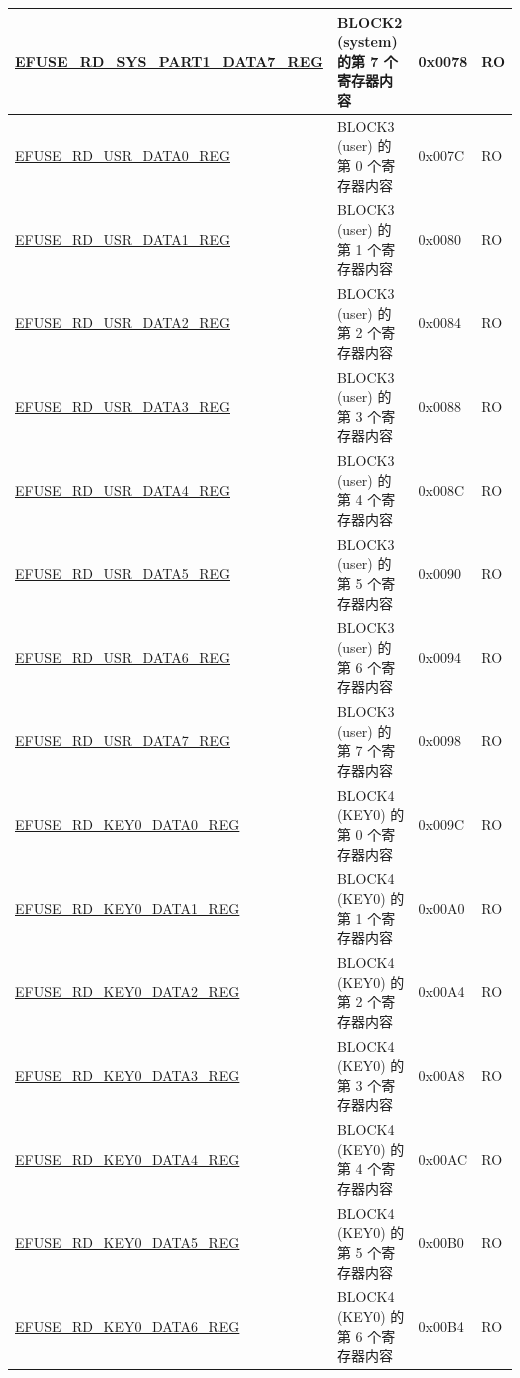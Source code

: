 \begin{longtable}{ | p{5.8cm} | p{7cm} | p{1.3cm} | p{1.2cm} | }
\hyperref[regdesc:EFUSERDSYSPART1DATA7REG]{EFUSE\_RD\_SYS\_PART1\_DATA7\_REG} & BLOCK2 (system) 的第 7 个寄存器内容 & 0x0078 & RO \\ \hline
\hyperref[regdesc:EFUSERDUSRDATA0REG]{EFUSE\_RD\_USR\_DATA0\_REG} & BLOCK3 (user) 的第 0 个寄存器内容 & 0x007C & RO \\ \hline
\hyperref[regdesc:EFUSERDUSRDATA1REG]{EFUSE\_RD\_USR\_DATA1\_REG} & BLOCK3 (user) 的第 1 个寄存器内容 & 0x0080 & RO \\ \hline
\hyperref[regdesc:EFUSERDUSRDATA2REG]{EFUSE\_RD\_USR\_DATA2\_REG} & BLOCK3 (user) 的第 2 个寄存器内容 & 0x0084 & RO \\ \hline
\hyperref[regdesc:EFUSERDUSRDATA3REG]{EFUSE\_RD\_USR\_DATA3\_REG} & BLOCK3 (user) 的第 3 个寄存器内容 & 0x0088 & RO \\ \hline
\hyperref[regdesc:EFUSERDUSRDATA4REG]{EFUSE\_RD\_USR\_DATA4\_REG} & BLOCK3 (user) 的第 4 个寄存器内容 & 0x008C & RO \\ \hline
\hyperref[regdesc:EFUSERDUSRDATA5REG]{EFUSE\_RD\_USR\_DATA5\_REG} & BLOCK3 (user) 的第 5 个寄存器内容 & 0x0090 & RO \\ \hline
\hyperref[regdesc:EFUSERDUSRDATA6REG]{EFUSE\_RD\_USR\_DATA6\_REG} & BLOCK3 (user) 的第 6 个寄存器内容 & 0x0094 & RO \\ \hline
\hyperref[regdesc:EFUSERDUSRDATA7REG]{EFUSE\_RD\_USR\_DATA7\_REG} & BLOCK3 (user) 的第 7 个寄存器内容 & 0x0098 & RO \\ \hline
\hyperref[regdesc:EFUSERDKEY0DATA0REG]{EFUSE\_RD\_KEY0\_DATA0\_REG} & BLOCK4 (KEY0) 的第 0 个寄存器内容 & 0x009C & RO \\ \hline
\hyperref[regdesc:EFUSERDKEY0DATA1REG]{EFUSE\_RD\_KEY0\_DATA1\_REG} & BLOCK4 (KEY0) 的第 1 个寄存器内容 & 0x00A0 & RO \\ \hline
\hyperref[regdesc:EFUSERDKEY0DATA2REG]{EFUSE\_RD\_KEY0\_DATA2\_REG} & BLOCK4 (KEY0) 的第 2 个寄存器内容 & 0x00A4 & RO \\ \hline
\hyperref[regdesc:EFUSERDKEY0DATA3REG]{EFUSE\_RD\_KEY0\_DATA3\_REG} & BLOCK4 (KEY0) 的第 3 个寄存器内容 & 0x00A8 & RO \\ \hline
\hyperref[regdesc:EFUSERDKEY0DATA4REG]{EFUSE\_RD\_KEY0\_DATA4\_REG} & BLOCK4 (KEY0) 的第 4 个寄存器内容 & 0x00AC & RO \\ \hline
\hyperref[regdesc:EFUSERDKEY0DATA5REG]{EFUSE\_RD\_KEY0\_DATA5\_REG} & BLOCK4 (KEY0) 的第 5 个寄存器内容 & 0x00B0 & RO \\ \hline
\hyperref[regdesc:EFUSERDKEY0DATA6REG]{EFUSE\_RD\_KEY0\_DATA6\_REG} & BLOCK4 (KEY0) 的第 6 个寄存器内容 & 0x00B4 & RO \\ \hline

\end{longtable}
